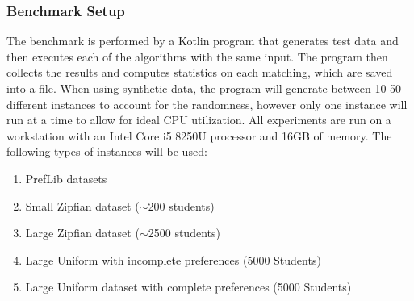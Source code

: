 \subsubsection{Benchmark Setup}
The benchmark is performed by a Kotlin program that generates test data and then executes each of the algorithms with the same input. The program then collects the results and computes statistics on each matching, which are saved into a file. When using synthetic data, the program will generate between 10-50 different instances to account for the randomness, however only one instance will run at a time to allow for ideal CPU utilization. All experiments are run on a workstation with an Intel Core i5 8250U processor and 16GB of memory. The following types of instances will be used:
\begin{enumerate}
  \item PrefLib datasets
  \item Small Zipfian dataset ($\sim$200 students)
  \item Large Zipfian dataset ($\sim$2500 students)
  \item Large Uniform with incomplete preferences (5000 Students)
  \item Large Uniform dataset with complete preferences (5000 Students)
\end{enumerate}

